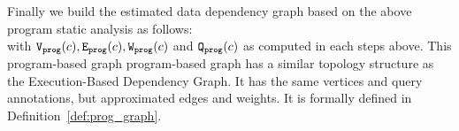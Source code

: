 Finally we build the estimated data dependency graph based on the above program static analysis as follows:
\\
\highlight{
  \[
    \progG(c) = (\progV(c), \progE(c), \progW(c), \progF(c))
    \]
}
with $\mathtt{{V_{prog}}}(c), \mathtt{{E_{prog}}}(c), \mathtt{{W_{prog}}}(c)$ and $ \mathtt{{Q_{prog}}}(c)$ as computed in each steps above.
This program-based graph program-based graph has a similar topology structure as 
the Execution-Based Dependency Graph. It has the same
vertices and query annotations, but approximated edges and weights.  
It is formally defined in Definition~\ref{def:prog_graph}.
